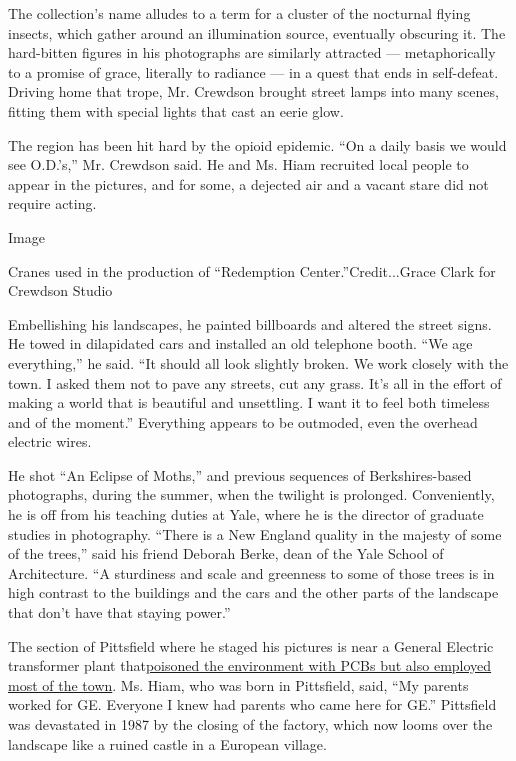 The collection's name alludes to a term for a cluster of the nocturnal
flying insects, which gather around an illumination source, eventually
obscuring it. The hard-bitten figures in his photographs are similarly
attracted --- metaphorically to a promise of grace, literally to
radiance --- in a quest that ends in self-defeat. Driving home that
trope, Mr. Crewdson brought street lamps into many scenes, fitting them
with special lights that cast an eerie glow.

The region has been hit hard by the opioid epidemic. ``On a daily basis
we would see O.D.'s,'' Mr. Crewdson said. He and Ms. Hiam recruited
local people to appear in the pictures, and for some, a dejected air and
a vacant stare did not require acting.

Image

Cranes used in the production of ``Redemption Center.''Credit...Grace
Clark for Crewdson Studio

Embellishing his landscapes, he painted billboards and altered the
street signs. He towed in dilapidated cars and installed an old
telephone booth. ``We age everything,'' he said. ``It should all look
slightly broken. We work closely with the town. I asked them not to pave
any streets, cut any grass. It's all in the effort of making a world
that is beautiful and unsettling. I want it to feel both timeless and of
the moment.'' Everything appears to be outmoded, even the overhead
electric wires.

He shot ``An Eclipse of Moths,'' and previous sequences of
Berkshires-based photographs, during the summer, when the twilight is
prolonged. Conveniently, he is off from his teaching duties at Yale,
where he is the director of graduate studies in photography. ``There is
a New England quality in the majesty of some of the trees,'' said his
friend Deborah Berke, dean of the Yale School of Architecture. ``A
sturdiness and scale and greenness to some of those trees is in high
contrast to the buildings and the cars and the other parts of the
landscape that don't have that staying power.''

The section of Pittsfield where he staged his pictures is near a General
Electric transformer plant
that\href{https://www.wbur.org/radioboston/2016/06/29/ge-and-pittsfield}{poisoned
the environment with PCBs but also employed most of the town}. Ms. Hiam,
who was born in Pittsfield, said, ``My parents worked for GE. Everyone I
knew had parents who came here for GE.'' Pittsfield was devastated in
1987 by the closing of the factory, which now looms over the landscape
like a ruined castle in a European village.

